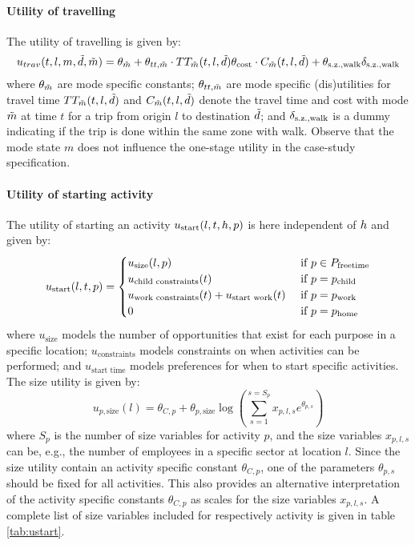 \paragraph{Utility of travelling}
The utility of travelling is given by:
\begin{equation} \label{eq:utravel}
u_{trav}(t,l,m,\act{d},\act{m}) = \mc_{\act{m}} + \theta_{tt,\act{m}} \cdot \TT_{\act{m}}(t,l,\act{d}) \theta_{\cost} \cdot C_{\act{m}}(t,l,\act{d}) +\theta_{\geqfive} \dummy{\geqfive}
\end{equation}
where $\theta_{\tilde{m}}$ are mode specific constants; $\theta_{tt,\tilde{m}}$ are mode specific (dis)utilities for travel time  $TT_{\tilde{m}}(t,l,\tilde{d})$ and $C_{\tilde{m}}(t,l,\tilde{d})$ denote the travel time and cost with mode $\tilde{m}$ at time $t$ for a trip from origin $l$ to destination $\tilde{d}$; and $\delta_{\text{s.z.,walk}}$ is a dummy indicating if the trip is done within the same zone with walk. Observe that the mode state $m$ does not influence the one-stage utility in the case-study specification.

\paragraph{Utility of starting activity}
The utility of starting an activity $u_\text{start}(l,t,h, p)$ is here independent of $h$ and given by:
\begin{equation}
	\ustart(l,t,p) = \begin{cases}
	u_{\text{size}}(l,p) & \cif p \in P_{\text{freetime}} \\
	u_\text{child constraints}(t) & \cif p = \p{child} \\
	u_\text{work constraints}(t)  + u_{\text{start work}}(t) & \cif p = \p{work} \\
	0 & \cif p = \p{home}  
	\end{cases} 
\end{equation}
where $u_{\text{size}}$ models the number of opportunities that exist for each purpose in a specific location; $u_\text{constraints}$ models constraints on when activities can be performed; and $u_{\text{start time}}$ models preferences for when to start specific activities. The size utility is given by:
\begin{equation*}
u_{p,\text{size}}(l) =\theta_{C,p} + \theta_{p,\text{size}}\log \left( \sum_{s=1}^{s=S_p} x_{p,l,s}e^{\theta_{p,s}} \right)
\end{equation*}
where $S_p$ is the number of size variables for activity $p$, and the size variables $x_{p,l,s}$ can be, e.g., the number of employees in a specific sector at location $l$. Since the size utility contain an activity specific constant $\theta_{C,p}$, one of the parameters $\theta_{p,s}$ should be fixed for all activities. This also provides an alternative interpretation of the activity specific constants $\theta_{C,p}$ as scales for the size variables $x_{p,l,s}$. A complete list of size variables included for respectively activity is given in table \ref{tab:ustart}. 

